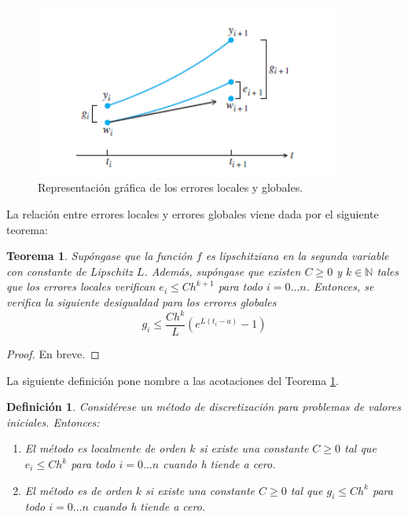 \documentclass{article}
\theoremstyle{theorem-style}  %
\newtheorem{theorem}{Teorema}[section]  %
\theoremstyle{definition-style}
\newtheorem{definition}{Definición}[section]
\theoremstyle{example-style}
\begin{document}
	\begin{figure}[h]
		\centering
		\includegraphics[width=10cm]{./Images/error-euler.png}
		\caption{Representación gráfica de los errores locales y globales.}
		\label{fig:error}
	\end{figure}

	La relación entre errores locales y errores globales viene dada por el siguiente teorema: \\

	\begin{theorem} \label{theorem:local-global-error}
		Supóngase que la función $f$ es lipschitziana en la segunda variable con constante de Lipschitz $L$. Además, supóngase que existen $C \ge 0$ y $k \in \mathbb{N}$ tales que los errores locales verifican $e_i \le C h^{k+1}$ para todo $i = 0 \ldots n$. Entonces, se verifica la siguiente desigualdad para los errores globales
		\begin{equation}
			g_i \le \frac{C h^k}{L} (e^{L(t_i-a)}-1)
		\end{equation}
	\end{theorem}
	\begin{proof}
		En breve.
	\end{proof}

	La siguiente definición pone nombre a las acotaciones del Teorema \ref{theorem:local-global-error}.

	\begin{definition}
		Considérese un método de discretización para problemas de valores iniciales. Entonces:
		\begin{enumerate}
			\item El método es localmente de orden $k$ si existe una constante $C \ge 0$ tal que $e_i \le C h^k$ para todo $i = 0 \ldots n$ cuando h tiende a cero.
			\item El método es de orden $k$ si existe una constante $C \ge 0$ tal que $g_i \le C h^k$ para todo $i = 0 \ldots n$ cuando h tiende a cero.
		\end{enumerate}
	\end{definition}
\end{document}
